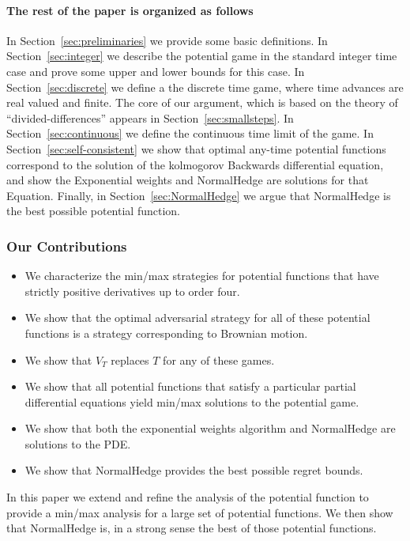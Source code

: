 \paragraph*{The rest of the paper is organized as follows}
In Section~\ref{sec:preliminaries} we provide some basic definitions.
In Section~\ref{sec:integer} we describe the potential game in the standard
integer time case and prove some upper and lower bounds for this
case. In Section~\ref{sec:discrete} we define a the discrete time
game, where time advances are real valued and finite. The core of our
argument, which is based on the theory of ``divided-differences''
appears in Section~\ref{sec:smallsteps}. In
Section~\ref{sec:continuous} we define the continuous time limit of
the game. In Section~\ref{sec:self-consistent} we show that optimal
any-time potential functions correspond to the solution of the
kolmogorov Backwards differential equation, and show the Exponential weights and
NormalHedge are solutions for that Equation. Finally, in
Section~\ref{sec:NormalHedge}
we argue that NormalHedge is the best possible potential function.

  \fi

  \iffalse
\subsubsection*{Our Contributions}
\begin{itemize}
\item We characterize the min/max strategies for 
  potential functions that have strictly positive derivatives up to
  order four.
\item We show that the optimal adversarial strategy for all of
  these potential functions is a strategy corresponding to
  Brownian motion.
\item We show that $V_T$ replaces $T$ for any of these games.
\item  We show that all potential functions that satisfy a particular
  partial differential equations yield min/max solutions to the
  potential game.
\item We show that both the exponential weights algorithm and
  NormalHedge are solutions to the PDE.
  \item We show that NormalHedge provides the best possible regret bounds.
\end{itemize}

In this paper we extend and refine the analysis of the potential
function to
provide a min/max analysis for a large set of potential functions. We
then show that NormalHedge is, in a strong sense the best of those
potential functions.

